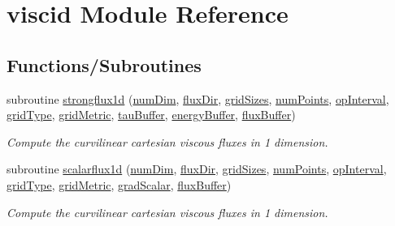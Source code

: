 \hypertarget{namespaceviscid}{}\section{viscid Module Reference}
\label{namespaceviscid}
\subsection*{Functions/\+Subroutines}
\begin{DoxyCompactItemize}
\item 
subroutine \hyperlink{namespaceviscid_aa370fc5ec33429588facc68ee01d8435}{strongflux1d} (\hyperlink{SATKernels_8H_a680185db8546de161968dabace9e94f1}{num\+Dim}, \hyperlink{ViscidKernels_8H_a466b72ae195460a9c9f2d36373803dc5}{flux\+Dir}, \hyperlink{ViscidKernels_8H_a969a5d6106eec8b7096250b27865b9ba}{grid\+Sizes}, \hyperlink{ViscidKernels_8H_adf0bf75d0875d1bb42a5348bee7b7bfd}{num\+Points}, \hyperlink{WENOKernels_8H_a23d86f4608a92738225f87574392b273}{op\+Interval}, \hyperlink{WENOKernels_8H_ab35a6cf312bb0fddda7097a149c3e946}{grid\+Type}, \hyperlink{WENOKernels_8H_a901f07fa4e3f966a2f6951d6c5974e89}{grid\+Metric}, \hyperlink{ViscidKernels_8H_a4fefa736ee83a524669dc93b83a218df}{tau\+Buffer}, \hyperlink{ViscidKernels_8H_a19a1cdfafabea8c3529fb1f5f0f12fcc}{energy\+Buffer}, \hyperlink{ViscidKernels_8H_abbdaff041c5151009f87fbae1b58e666}{flux\+Buffer})
\begin{DoxyCompactList}\small\item\em Compute the curvilinear cartesian viscous fluxes in 1 dimension. \end{DoxyCompactList}\item 
subroutine \hyperlink{namespaceviscid_aa6a01cbecb9c6bafc111dc0dd7411891}{scalarflux1d} (\hyperlink{SATKernels_8H_a680185db8546de161968dabace9e94f1}{num\+Dim}, \hyperlink{ViscidKernels_8H_a466b72ae195460a9c9f2d36373803dc5}{flux\+Dir}, \hyperlink{ViscidKernels_8H_a969a5d6106eec8b7096250b27865b9ba}{grid\+Sizes}, \hyperlink{ViscidKernels_8H_adf0bf75d0875d1bb42a5348bee7b7bfd}{num\+Points}, \hyperlink{WENOKernels_8H_a23d86f4608a92738225f87574392b273}{op\+Interval}, \hyperlink{WENOKernels_8H_ab35a6cf312bb0fddda7097a149c3e946}{grid\+Type}, \hyperlink{WENOKernels_8H_a901f07fa4e3f966a2f6951d6c5974e89}{grid\+Metric}, \hyperlink{ViscidKernels_8H_a239db5332b411ca172b2f9bf4b0d92bf}{grad\+Scalar}, \hyperlink{ViscidKernels_8H_abbdaff041c5151009f87fbae1b58e666}{flux\+Buffer})
\begin{DoxyCompactList}\small\item\em Compute the curvilinear cartesian viscous fluxes in 1 dimension. \end{DoxyCompactList}\end{DoxyCompactItemize}



